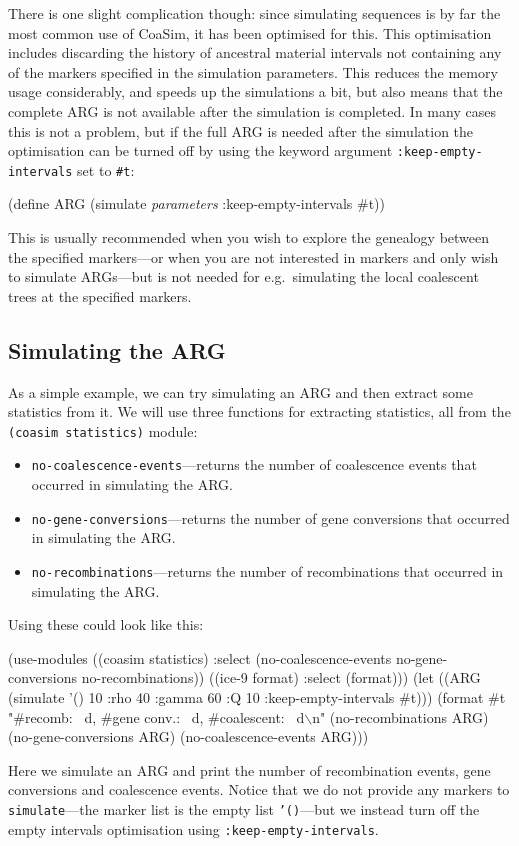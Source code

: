 \documentclass{manual}
\begin{document}
\begin{empfile}
There is one slight complication though: since simulating sequences is
by far the most common use of CoaSim, it has been optimised for this.
This optimisation includes discarding the history of ancestral
material intervals not containing any of the markers specified in the
simulation parameters.  This reduces the memory usage considerably,
and speeds up the simulations a bit, but also means that the complete
ARG is not available after the simulation is completed.  In many cases
this is not a problem, but if the full ARG is needed after the
simulation the optimisation can be turned off by using the keyword
argument \texttt{:keep-empty-intervals} set to \texttt{\#t}:

\begin{code}
(define ARG (simulate \emph{parameters} :keep-empty-intervals \#t))
\end{code}

This is usually recommended when you wish to explore the genealogy
between the specified markers---or when you are not interested in
markers and only wish to simulate ARGs---but is not needed for e.g.\
simulating the local coalescent trees at the specified markers.


\subsection{Simulating the ARG}
\label{sec:simulating-arg}

As a simple example, we can try simulating an ARG and then extract
some statistics from it.  We will use three functions for
extracting statistics, all from the \texttt{(coasim statistics)} module:
\begin{itemize}
\item \texttt{no-coalescence-events}---returns the number of
  coalescence events that occurred in simulating the ARG.
\item \texttt{no-gene-conversions}---returns the number of gene
  conversions that occurred in simulating the ARG.
\item \texttt{no-recombinations}---returns the number of
  recombinations that occurred in simulating the ARG.
\end{itemize}

Using these could look like this:
\begin{code}
(use-modules ((coasim statistics) :select (no-coalescence-events
                                           no-gene-conversions
                                           no-recombinations))
             ((ice-9 format) :select (format)))
(let ((ARG (simulate '() 10
                     :rho 40 :gamma 60 :Q 10
                     :keep-empty-intervals \#t)))
  (format #t "#recomb: ~d, #gene conv.: ~d, #coalescent: ~d\(\backslash\)n"
          (no-recombinations     ARG)
          (no-gene-conversions   ARG)
          (no-coalescence-events ARG)))  
\end{code}
Here we simulate an ARG and print the number of recombination events,
gene conversions and coalescence events.  Notice that we do not
provide any markers to \texttt{simulate}---the marker list is the
empty list \texttt{'()}---but we instead turn off the empty intervals
optimisation using \texttt{:keep-empty-intervals}.


\end{empfile}
\end{document}
